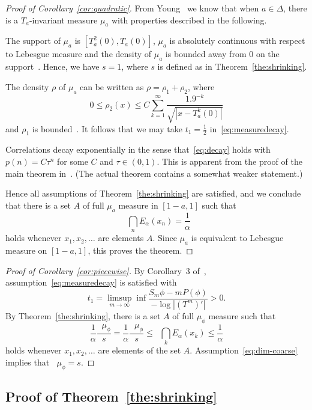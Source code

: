 \documentclass[AHL,Unicode,longabstracts]{cedram}
\DeclareMathOperator{\dimh}{dim_H}
\DeclareMathOperator{\udimh}{\overline{dim}_H}
\newcommand*{\dimh}{\mathrm{dim}_{\mathrm{H}}}
\begin{document}
\begin{proof}[Proof of Corollary~\ref{cor:quadratic}]
From Young~\cite{young} we know that when $a \in \Delta$, there is a $T_a$-invariant measure $\mu_a$ with properties described in the following.

The support of $\mu_a$ is $[T_a^2 (0), T_a (0)]$, $\mu_a$ is absolutely continuous with respect to Lebesgue measure and the density of $\mu_a$ is bounded away from $0$ on the support~\cite[Theorem~2]{young}. Hence, we have $s=1$, where $s$ is defined as in Theorem~\ref{the:shrinking}.

The density $\rho$ of $\mu_a$ can be written as $\rho = \rho_1 +
\rho_2$, where
\[
0 \leq \rho_2 (x) \leq C \sum_{k=1}^\infty \frac{1.9^{-k}}{\sqrt{|x - T_a^k (0)|}}
\]
and $\rho_1$ is bounded~\cite[Theorem~1]{young}. It follows that we may take $t_1 = \frac{1}{2}$ in~\eqref{eq:measuredecay}.

Correlations decay exponentially in the sense that~\eqref{eq:decay} holds with $p(n) = C \tau^n$ for some $C$ and $\tau \in (0,1)$. This is apparent from the proof of the main theorem in~\cite{young}. (The actual theorem contains a somewhat weaker statement.)

Hence all assumptions of Theorem~\ref{the:shrinking} are satisfied, and we conclude that there is a set $A$ of full $\mu_a$ measure in $[1-a,1]$ such that
\[
\dimh \bigcap_n E_\alpha (x_n) = \frac{1}{\alpha}
\]
holds whenever $x_1, x_2, \ldots$ are elements $A$. Since $\mu_a$ is equivalent to Lebesgue measure on $[1-a,1]$, this proves the theorem.
\end{proof}

\begin{proof}[Proof of Corollary~\ref{cor:piecewise}]
By Corollary~3 of~\cite{perssonrams}, assumption~\eqref{eq:measuredecay} is satisfied with
\[
t_1 = \limsup_{m\to \infty} \inf \frac{S_m \phi - m P(\phi)}{- \log |(T^m)'|} > 0.
\]
By Theorem~\ref{the:shrinking}, there is a set $A$ of full $\mu_\phi$ measure such that
\[
\frac{1}{\alpha} \frac{\dimh \mu_\phi}{s} = \frac{1}{\alpha}
\frac{\udimh \mu_\phi}{s} \leq \dimh \bigcap_k E_\alpha (x_k) \leq
\frac{1}{\alpha}
\]
holds whenever $x_1, x_2, \ldots$ are elements of the set $A$. Assumption~\eqref{eq:dim-coarse} implies that $\dimh \mu_\phi = s$.
\end{proof}


\subsection{Proof of Theorem~\ref{the:shrinking}}
\end{document}
